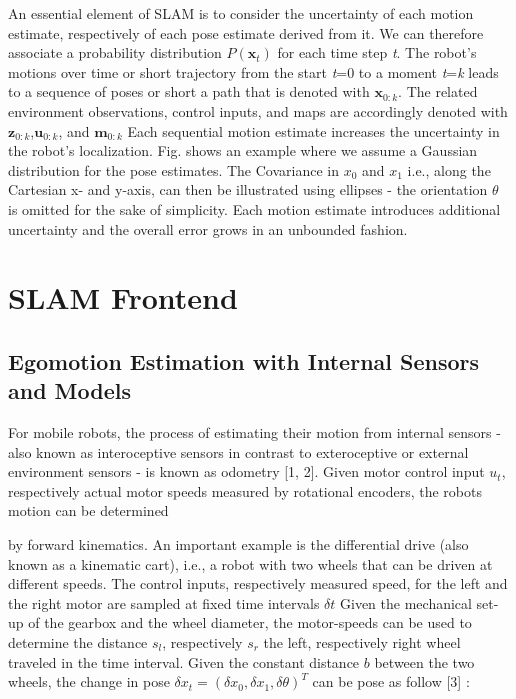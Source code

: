 \documentclass[english]{article}
\begin{document}
 An essential element of SLAM is to consider the uncertainty of each motion estimate, respectively of each pose estimate derived from it. We can therefore associate a probability distribution $P(\mathbf{x}_t)$ for each time step \textit{t}. The robot’s motions over time or short trajectory from the start \textit{t}=0 to a moment \textit{t}=\textit{k} leads to a sequence of poses or short a path that is denoted with $\mathbf{x}_{0:k}$. The related environment observations, control inputs, and maps are
accordingly denoted with $\mathbf{z}_{0:k}$,$\mathbf{u}_{0:k}$, and $\mathbf{m}_{0:k}$ Each sequential motion estimate increases the uncertainty in the robot’s localization. Fig.\cite{2} shows an example where we assume a Gaussian distribution for the pose estimates. The Covariance in $\mathit{x}_{0}$ and $\mathit{x}_{1}$ i.e., along the Cartesian x- and y-axis, can then be illustrated using ellipses - the
orientation $\theta$ is omitted for the sake of simplicity. Each motion estimate introduces additional uncertainty and the overall error grows in an unbounded fashion.

\section{SLAM Frontend}
\subsection{Egomotion Estimation with Internal Sensors and Models}
\noindent For mobile robots, the process of estimating their motion from internal sensors - also known as interoceptive sensors in contrast to exteroceptive or external environment sensors - is known as odometry [1, 2]. Given motor control input $\mathit{u_{t}}$, respectively actual motor speeds measured by rotational encoders, the robots motion can be determined 


\noindent by forward kinematics. An important example is the differential drive (also known as a kinematic cart), i.e., a robot with two wheels that can be driven at different speeds. The control inputs, respectively measured speed, for the left and the right motor are sampled at fixed time intervals $\delta t$ Given the mechanical set-up of the gearbox and the wheel diameter, the motor-speeds can be used to determine the distance $\mathit{s_{l}}$, respectively  $\mathit{s_{r}}$ the left, respectively right wheel traveled in the time interval. Given the constant distance $\mathit{b}$ between the two wheels, the change in pose  $\delta x_{t}= (\delta x_{0},\delta x_{1},\delta \theta)^{T}$ can be pose as follow [3] :
\end{document}
